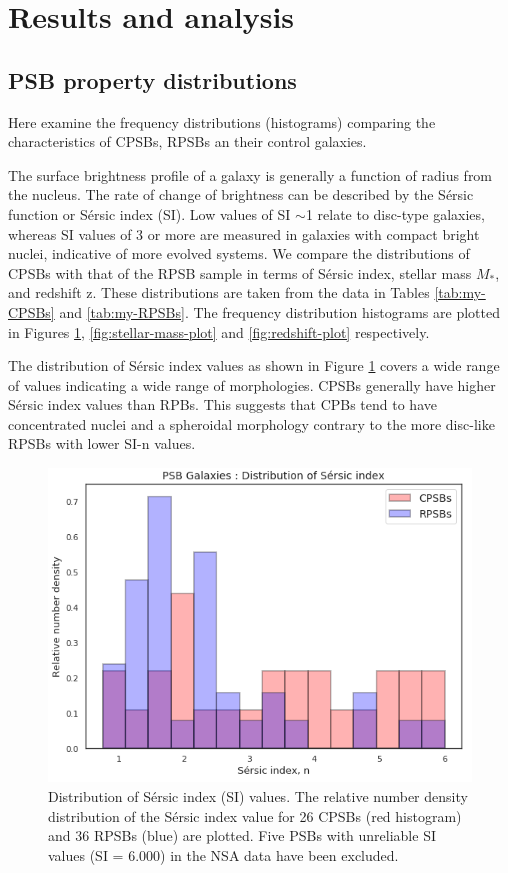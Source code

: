 \section{Results and analysis}
\label{sec:analysis}

\subsection{PSB property distributions}
Here examine the frequency distributions (histograms) comparing the characteristics of CPSBs, RPSBs an their control galaxies.

The surface brightness profile of a galaxy is generally a function of radius from the nucleus. The rate of change of brightness can be described by the S\'ersic function or S\'ersic  index (SI). Low values of SI $\sim$1 relate to disc-type galaxies, whereas SI values of 3 or more are measured in galaxies with compact bright nuclei, indicative of more evolved systems. We compare the distributions of CPSBs with that of the RPSB sample in terms of S\'ersic index, stellar mass $M_*$, and redshift z. These distributions are taken from the data in Tables \ref{tab:my-CPSBs} and \ref{tab:my-RPSBs}. The frequency distribution histograms are plotted in Figures \ref{fig:Sersic-plot}, \ref{fig:stellar-mass-plot} and \ref{fig:redshift-plot} respectively.

The distribution of S\'ersic index values as shown in Figure \ref{fig:Sersic-plot} covers a wide range of values indicating a wide range of morphologies. CPSBs  generally have higher S\'ersic index values than RPBs. This suggests that CPBs tend to have concentrated nuclei and a spheroidal morphology contrary to the more disc-like RPSBs with lower SI-n values.

\begin{figure}
    \centering
    \includegraphics[width=\columnwidth]{images/JupyterPlots/Dist-Sersic-Index-All.png}
    \caption{Distribution of S\'ersic index (SI) values. The relative number density distribution of the S\'ersic index value for 26 CPSBs (red histogram) and 36 RPSBs (blue) are plotted. Five PSBs with unreliable SI values (SI = 6.000) in the NSA data  have been excluded.}
    \label{fig:Sersic-plot}
\end{figure}

